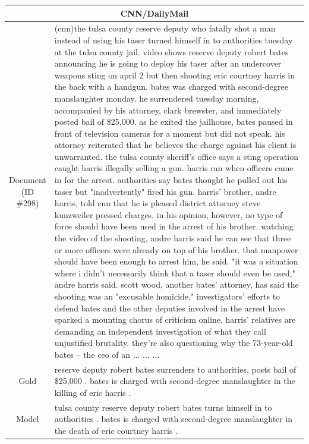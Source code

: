 \begin{table}[bth!]
\scriptsize
\centering
\renewcommand{\arraystretch}{1.3}
\begin{tabular}{c|p{}}
\hline
\multicolumn{2}{c}{CNN/DailyMail} \\ \hline
\makecell{Document\\(ID \#298)} & 
(cnn)the tulsa county reserve deputy who fatally shot a man instead of using his taser turned himself in to authorities tuesday at the tulsa county jail. video shows reserve deputy robert bates announcing he is going to deploy his taser after an undercover weapons sting on april 2 but then shooting eric courtney harris in the back with a handgun. bates was charged with second-degree manslaughter monday. he surrendered tuesday morning, accompanied by his attorney, clark brewster, and immediately posted bail of \$25,000. as he exited the jailhouse, bates paused in front of television cameras for a moment but did not speak. his attorney reiterated that he believes the charge against his client is unwarranted. the tulsa county sheriff's office says a sting operation caught harris illegally selling a gun. harris ran when officers came in for the arrest. authorities say bates thought he pulled out his taser but "inadvertently" fired his gun. harris' brother, andre harris, told cnn that he is pleased district attorney steve kunzweiler pressed charges. in his opinion, however, no type of force should have been used in the arrest of his brother. watching the video of the shooting, andre harris said he can see that three or more officers were already on top of his brother. that manpower should have been enough to arrest him, he said. "it was a situation where i didn't necessarily think that a taser should even be used," andre harris said. scott wood, another bates' attorney, has said the shooting was an "excusable homicide." investigators' efforts to defend bates and the other deputies involved in the arrest have sparked a mounting chorus of criticism online. harris' relatives are demanding an independent investigation of what they call unjustified brutality. they're also questioning why the 73-year-old bates -- the ceo of an ... ... ... 
\\ \hline
Gold & 
reserve deputy robert bates surrenders to authorities, posts bail of \$25,000 . bates is charged with second-degree manslaughter in the killing of eric harris .
\\ \hline
Model & 
tulsa county reserve deputy robert bates turns himself in to authorities . bates is charged with second-degree manslaughter in the death of eric courtney harris .

\end{tabular}
\end{table}
